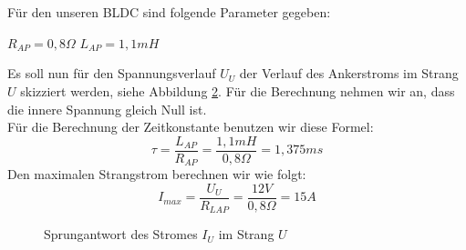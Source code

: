 \section{}\label{sec:2d}
Für den unseren BLDC sind folgende Parameter gegeben:
\begin{center}
	 $ R_{AP} = 0,8\Omega $ \hspace{2cm} $ L_{AP} = 1,1mH$\\
\end{center}
Es soll nun für den Spannungsverlauf $ U_{U} $ der Verlauf des Ankerstroms im Strang $ U $ skizziert werden, siehe Abbildung \ref{fig:2d:strom}. Für die Berechnung nehmen wir an, dass die innere Spannung gleich Null ist.\\
Für die Berechnung der Zeitkonstante benutzen wir diese Formel:\\
\begin{equation}
	\tau = \frac{L_{AP}}{R_{AP}} = \frac{1,1mH}{0,8\Omega} = 1,375ms
\end{equation}
Den maximalen Strangstrom berechnen wir wie folgt:
\begin{equation}
	I_{max} = \frac{U_{U}}{R_{LAP}} = \frac{12V}{0,8\Omega} = 15A
\end{equation}
\begin{figure}[t]
	\centering
	\begin{subfigure}[Spannung im Strang $ U $]
		{}
	\end{subfigure}
	\begin{subfigure}[Stromverlauf im Strang $ U $]
		{}
		\label{fig:2d:strom}
	\end{subfigure}
	\caption{Sprungantwort des Stromes $ I_{U} $ im Strang $ U $}
\end{figure}



\clearpage
